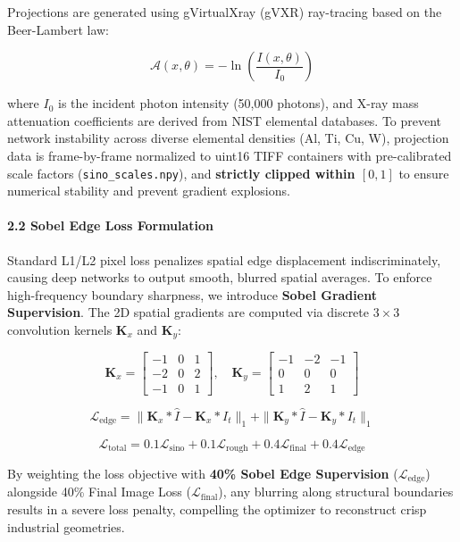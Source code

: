 \documentclass[
]{article}
\begin{document}
Projections are generated using gVirtualXray (gVXR) ray-tracing based on
the Beer-Lambert law:

\[\mathcal{A}(x, \theta) = -\ln\left(\frac{I(x, \theta)}{I_0}\right)\]

where \(I_0\) is the incident photon intensity (50,000 photons), and
X-ray mass attenuation coefficients are derived from NIST elemental
databases. To prevent network instability across diverse elemental
densities (Al, Ti, Cu, W), projection data is frame-by-frame normalized
to uint16 TIFF containers with pre-calibrated scale factors
(\texttt{sino\_scales.npy}), and \textbf{strictly clipped within
\([0, 1]\)} to ensure numerical stability and prevent gradient
explosions.

\paragraph{2.2 Sobel Edge Loss
Formulation}\label{sobel-edge-loss-formulation}

Standard L1/L2 pixel loss penalizes spatial edge displacement
indiscriminately, causing deep networks to output smooth, blurred
spatial averages. To enforce high-frequency boundary sharpness, we
introduce \textbf{Sobel Gradient Supervision}. The 2D spatial gradients
are computed via discrete \(3 \times 3\) convolution kernels
\(\mathbf{K}_x\) and \(\mathbf{K}_y\):

\[\mathbf{K}_x = \begin{bmatrix} -1 & 0 & 1 \\ -2 & 0 & 2 \\ -1 & 0 & 1 \end{bmatrix}, \quad \mathbf{K}_y = \begin{bmatrix} -1 & -2 & -1 \\ 0 & 0 & 0 \\ 1 & 2 & 1 \end{bmatrix}\]

\[\mathcal{L}_{\text{edge}} = \|\mathbf{K}_x * \hat{I} - \mathbf{K}_x * I_t\|_1 + \|\mathbf{K}_y * \hat{I} - \mathbf{K}_y * I_t\|_1\]

\[\mathcal{L}_{\text{total}} = 0.1 \mathcal{L}_{\text{sino}} + 0.1 \mathcal{L}_{\text{rough}} + 0.4 \mathcal{L}_{\text{final}} + 0.4 \mathcal{L}_{\text{edge}}\]

By weighting the loss objective with \textbf{40\% Sobel Edge
Supervision} (\(\mathcal{L}_{\text{edge}}\)) alongside 40\% Final Image
Loss (\(\mathcal{L}_{\text{final}}\)), any blurring along structural
boundaries results in a severe loss penalty, compelling the optimizer to
reconstruct crisp industrial geometries.
\end{document}
